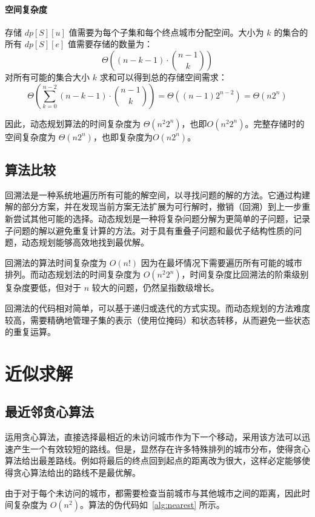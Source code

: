 \paragraph{空间复杂度}
存储 \( dp[S][u] \) 值需要为每个子集和每个终点城市分配空间。大小为 \( k \) 的集合的所有 \( dp[S][e] \) 值需要存储的数量为：
\[
    \Theta\left((n-k-1) \cdot \binom{n-1}{k}\right)
\]
对所有可能的集合大小 \( k \) 求和可以得到总的存储空间需求：
\[
    \Theta\left(\sum_{k=0}^{n-2} (n-k-1) \cdot \binom{n-1}{k}\right) =\Theta\left((n-1)2^{n-2}\right) = \Theta(n2^n)
\]

因此，动态规划算法的时间复杂度为 \( \Theta(n^2 2^n) \)，也即\( O(n^2 2^n) \)。完整存储时的空间复杂度为 \( \Theta(n2^n) \)，也即复杂度为\( O(n2^n) \)。

\subsection{算法比较}

回溯法是一种系统地遍历所有可能的解空间，以寻找问题的解的方法。它通过构建解的部分方案，并在发现当前方案无法扩展为可行解时，撤销（回溯）到上一步重新尝试其他可能的选择。动态规划是一种将复杂问题分解为更简单的子问题，记录子问题的解以避免重复计算的方法。对于具有重叠子问题和最优子结构性质的问题，动态规划能够高效地找到最优解。

回溯法的算法时间复杂度为 $O(n!)$ 因为在最坏情况下需要遍历所有可能的城市排列。而动态规划法的时间复杂度为 $O(n^2 2^n)$，时间复杂度比回溯法的阶乘级别复杂度要低，但对于 $n$ 较大的问题，仍然呈指数级增长。

回溯法的代码相对简单，可以基于递归或迭代的方式实现。而动态规划的方法难度较高，需要精确地管理子集的表示（使用位掩码）和状态转移，从而避免一些状态的重复运算。

\section{近似求解}

\subsection{最近邻贪心算法}

运用贪心算法，直接选择最相近的未访问城市作为下一个移动，采用该方法可以迅速产生一个有效较短的路线。但是，显然存在许多特殊排列的城市分布，使得贪心算法给出最差路线。例如将最后的终点回到起点的距离改为很大，这样必定能够使得贪心算法给出的路线不是最优解。

由于对于每个未访问的城市，都需要检查当前城市与其他城市之间的距离，因此时间复杂度为 $O(n^2)$。算法的伪代码如~\autoref{alg:nearest} 所示。

